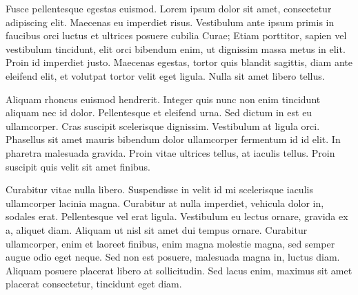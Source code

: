 \documentclass[final,inline,a4paper,narroweqnarray]{ieee}
\begin{document}
Fusce pellentesque egestas euismod. Lorem ipsum dolor sit amet, consectetur adipiscing elit. Maecenas eu imperdiet risus. Vestibulum ante ipsum primis in faucibus orci luctus et ultrices posuere cubilia Curae; Etiam porttitor, sapien vel vestibulum tincidunt, elit orci bibendum enim, ut dignissim massa metus in elit. Proin id imperdiet justo. Maecenas egestas, tortor quis blandit sagittis, diam ante eleifend elit, et volutpat tortor velit eget ligula. Nulla sit amet libero tellus.

Aliquam rhoncus euismod hendrerit. Integer quis nunc non enim tincidunt aliquam nec id dolor. Pellentesque et eleifend urna. Sed dictum in est eu ullamcorper. Cras suscipit scelerisque dignissim. Vestibulum at ligula orci. Phasellus sit amet mauris bibendum dolor ullamcorper fermentum id id elit. In pharetra malesuada gravida. Proin vitae ultrices tellus, at iaculis tellus. Proin suscipit quis velit sit amet finibus.

Curabitur vitae nulla libero. Suspendisse in velit id mi scelerisque iaculis ullamcorper lacinia magna. Curabitur at nulla imperdiet, vehicula dolor in, sodales erat. Pellentesque vel erat ligula. Vestibulum eu lectus ornare, gravida ex a, aliquet diam. Aliquam ut nisl sit amet dui tempus ornare. Curabitur ullamcorper, enim et laoreet finibus, enim magna molestie magna, sed semper augue odio eget neque. Sed non est posuere, malesuada magna in, luctus diam. Aliquam posuere placerat libero at sollicitudin. Sed lacus enim, maximus sit amet placerat consectetur, tincidunt eget diam.
\end{document}
